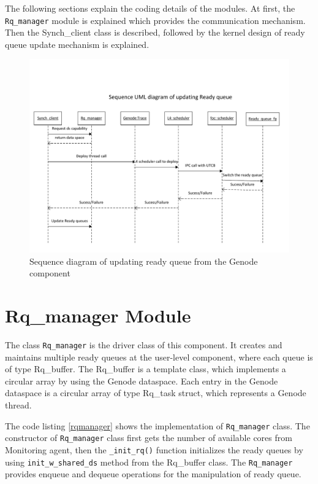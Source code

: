The following sections explain the coding details of the modules. At first, the \texttt{Rq\_manager} module is explained which provides the communication mechanism. Then the Synch\_client class is described, followed by the kernel design of ready queue update mechanism is explained.

\begin{figure}[h]
\centering
\includegraphics[width=1.0\linewidth]{figures/sequence_classUpdate}
\caption{Sequence diagram of updating ready queue from the Genode component}
\label{fig:sequence_classUpdate}
\end{figure}

\section{Rq\_manager Module}

 The class \texttt{Rq\_manager} is the driver class of this component. It creates and maintains multiple ready queues at the user-level component, where each queue is of type Rq\_buffer. The Rq\_buffer is a template class, which implements a circular array by using the Genode dataspace. Each entry in the Genode dataspace is a circular array of type Rq\_task struct, which represents a Genode thread.

The code listing \ref{rqmanager} shows the implementation of \texttt{Rq\_manager} class. The constructor of \texttt{Rq\_manager} class first gets the number of available cores from Monitoring agent, then the \texttt{\_init\_rq()} function initializes the ready queues by using \texttt{init\_w\_shared\_ds} method from the Rq\_buffer class. The \texttt{Rq\_manager} provides enqueue and dequeue operations for the manipulation of ready queue.

